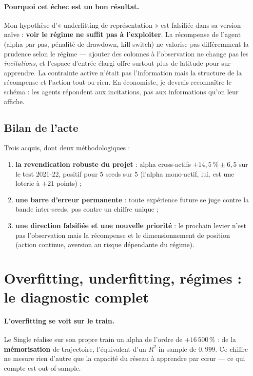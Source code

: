 \documentclass[11pt,a4paper]{article}
\begin{document}
\paragraph{Pourquoi cet échec est un bon résultat.} Mon hypothèse d'« underfitting de
représentation » est falsifiée dans sa version naïve : \textbf{voir le régime ne suffit
pas à l'exploiter}. La récompense de l'agent (alpha par pas, pénalité de drawdown,
kill-switch) ne valorise pas différemment la prudence selon le régime --- ajouter des
colonnes à l'observation ne change pas les \emph{incitations}, et l'espace d'entrée
élargi offre surtout plus de latitude pour sur-apprendre. La contrainte active n'était
pas l'information mais la structure de la récompense et l'action tout-ou-rien. En
économiste, je devrais reconnaître le schéma : les agents répondent aux incitations,
pas aux informations qu'on leur affiche.

\subsection{Bilan de l'acte}

Trois acquis, dont deux méthodologiques :
\begin{enumerate}[itemsep=2pt]
  \item \textbf{la revendication robuste du projet} : alpha cross-actifs
        $+14{,}5\,\% \pm 6{,}5$ sur le test 2021-22, positif pour 5 seeds sur 5
        (l'alpha mono-actif, lui, est une loterie à $\pm 21$ points) ;
  \item \textbf{une barre d'erreur permanente} : toute expérience future se juge
        contre la bande inter-seeds, pas contre un chiffre unique ;
  \item \textbf{une direction falsifiée et une nouvelle priorité} : le prochain levier
        n'est pas l'observation mais la récompense et le dimensionnement de position
        (action continue, aversion au risque dépendante du régime).
\end{enumerate}


\section{Overfitting, underfitting, régimes : le diagnostic complet}

\paragraph{L'overfitting se voit sur le train.} Le Single réalise sur son propre train
un alpha de l'ordre de $+16\,500\,\%$ : de la \textbf{mémorisation} de trajectoire,
l'équivalent d'un $R^2$ in-sample de $0{,}999$. Ce chiffre ne mesure rien d'autre que
la capacité du réseau à apprendre par c\oe ur --- ce qui compte est out-of-sample.
\end{document}
